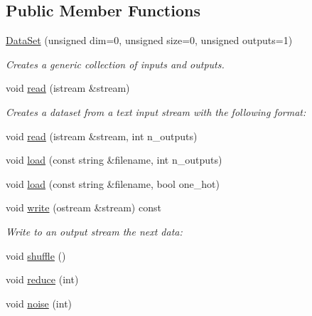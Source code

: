 \subsection*{Public Member Functions}
\begin{DoxyCompactItemize}
\item 
\hyperlink{classhappyml_1_1DataSet_a49c36517dc2ab29e2c20ba83e9c8a5ea}{Data\+Set} (unsigned dim=0, unsigned size=0, unsigned outputs=1)
\begin{DoxyCompactList}\small\item\em Creates a generic collection of inputs and outputs. \end{DoxyCompactList}\item 
void \hyperlink{classhappyml_1_1DataSet_aa2e2f9c87aefbf9c7a2b8793f197b828}{read} (istream \&stream)
\begin{DoxyCompactList}\small\item\em Creates a dataset from a text input stream with the following format\+: \end{DoxyCompactList}\item 
void \hyperlink{classhappyml_1_1DataSet_aeab3657e98d735fef9af63cd416f095a}{read} (istream \&stream, int n\+\_\+outputs)
\item 
void \hyperlink{classhappyml_1_1DataSet_a5cc37a7dae6c1757ee93dee1f95e91a6}{load} (const string \&filename, int n\+\_\+outputs)
\item 
void \hyperlink{classhappyml_1_1DataSet_ae1f10ba937cdf97e7ce6046c55a9a665}{load} (const string \&filename, bool one\+\_\+hot)
\item 
void \hyperlink{classhappyml_1_1DataSet_a1bed7d89826c5b9fb23c3e2d0f690b22}{write} (ostream \&stream) const 
\begin{DoxyCompactList}\small\item\em Write to an output stream the next data\+: \end{DoxyCompactList}\item 
void \hyperlink{classhappyml_1_1DataSet_a8706653aeaef403a278f178e4aa38f75}{shuffle} ()
\item 
void \hyperlink{classhappyml_1_1DataSet_a5ec56f6731cb4ef784936844b6409198}{reduce} (int)
\item 
void \hyperlink{classhappyml_1_1DataSet_ab56a70830be900d8a9b4e8f90f5c615a}{noise} (int)
\end{DoxyCompactItemize}
